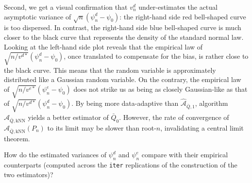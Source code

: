 \documentclass[11pt,openright,twoside]{book}
\newenvironment{Shaded}{\begin{snugshade}}{\end{snugshade}}
\newcommand{\CommentTok}[1]{\textcolor[rgb]{0.56,0.35,0.01}{\textit{#1}}}
\newcommand{\KeywordTok}[1]{\textcolor[rgb]{0.13,0.29,0.53}{\textbf{#1}}}
\newcommand{\NormalTok}[1]{#1}
\newcommand{\OperatorTok}[1]{\textcolor[rgb]{0.81,0.36,0.00}{\textbf{#1}}}
\newcommand{\StringTok}[1]{\textcolor[rgb]{0.31,0.60,0.02}{#1}}
\newcommand{\Algo}{\widehat{\mathcal{A}}}
\newcommand{\Qbar}{\bar{Q}}
\theoremstyle{definition}
\theoremstyle{definition}
\theoremstyle{definition}
\theoremstyle{remark}
\begin{document}
Second, we get a visual confirmation that \(v_{n}^{d}\) under-estimates the
actual asymptotic variance of \(\sqrt{n} (\psi_{n}^{d} - \psi_{0})\): the
right-hand side red bell-shaped curve is too dispersed. In contrast, the
right-hand side blue bell-shaped curve is much closer to the black curve that
represents the density of the standard normal law. Looking at the left-hand
side plot reveals that the empirical law of \(\sqrt{n/v^{d*}} (\psi_{n}^{d} - \psi_{0})\), once translated to compensate for the bias, is rather close to the
black curve. This means that the random variable is approximately distributed
like a Gaussian random variable. On the contrary, the empirical law of
\(\sqrt{n/v^{e*}} (\psi_{n}^{e} - \psi_{0})\) does not strike us as being as
closely Gaussian-like as that of \(\sqrt{n/v^{d*}} (\psi_{n}^{d} - \psi_{0})\).
By being more data-adaptive than \(\Algo_{\Qbar,1}\), algorithm
\(\Algo_{\Qbar,\text{kNN}}\) yields a better estimator of \(\Qbar_{0}\). However,
the rate of convergence of \(\Algo_{\Qbar,\text{kNN}}(P_{n})\) to its limit may
be slower than root-\(n\), invalidating a central limit theorem.

How do the estimated variances of \(\psi_{n}^{d}\) and \(\psi_{n}^{e}\) compare
with their empirical counterparts (computed across the \texttt{iter} replications of
the construction of the two estimators)?

\begin{Shaded}
\end{Shaded}
\end{document}

